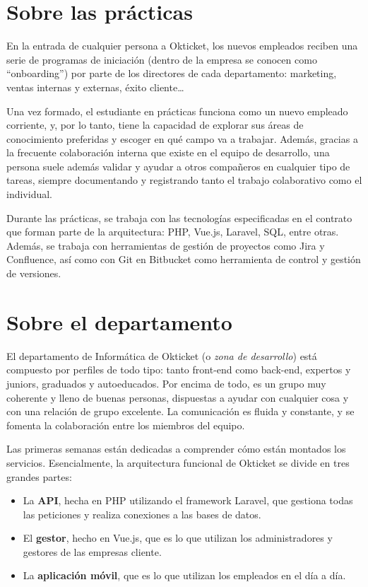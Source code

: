 \newpage{}
\section{Sobre las prácticas}
En la entrada de cualquier persona a Okticket, los nuevos empleados reciben una serie de
programas de iniciación (dentro de la empresa se conocen como ``onboarding'') por parte de
los directores de cada departamento: marketing, ventas internas y externas, éxito cliente…

Una vez formado, el estudiante en prácticas funciona como un nuevo empleado corriente, y,
por lo tanto, tiene la capacidad de explorar sus áreas de conocimiento preferidas y escoger
en qué campo va a trabajar. Además, gracias a la frecuente colaboración interna que existe
en el equipo de desarrollo, una persona suele además validar y ayudar a otros compañeros
en cualquier tipo de tareas, siempre documentando y registrando tanto el trabajo colaborativo
como el individual.

Durante las prácticas, se trabaja con las tecnologías especificadas en el contrato que
forman parte de la arquitectura: PHP, Vue.js, Laravel, SQL, entre otras. Además, se
trabaja con herramientas de gestión de proyectos como Jira y Confluence, así como con
Git en Bitbucket como herramienta de control y gestión de versiones.

\section{Sobre el departamento}
El departamento de Informática de Okticket (o \textit{zona de desarrollo}) está compuesto por
perfiles de todo tipo: tanto front-end como back-end, expertos y juniors, graduados y autoeducados.
Por encima de todo, es un grupo muy coherente y lleno de buenas personas, dispuestas a ayudar
con cualquier cosa y con una relación de grupo excelente. La comunicación es fluida y
constante, y se fomenta la colaboración entre los miembros del equipo.

Las primeras semanas están dedicadas a comprender cómo están montados los servicios.
Esencialmente, la arquitectura funcional de Okticket se divide en tres grandes partes:
\begin{itemize}
	\item La \textbf{API}, hecha en PHP utilizando el framework Laravel, que gestiona todas las
		peticiones y realiza conexiones a las bases de datos.
	\item El \textbf{gestor}, hecho en Vue.js, que es lo que utilizan los administradores y gestores
		de las empresas cliente.
	\item La \textbf{aplicación móvil}, que es lo que utilizan los empleados en el día a día.
\end{itemize}

